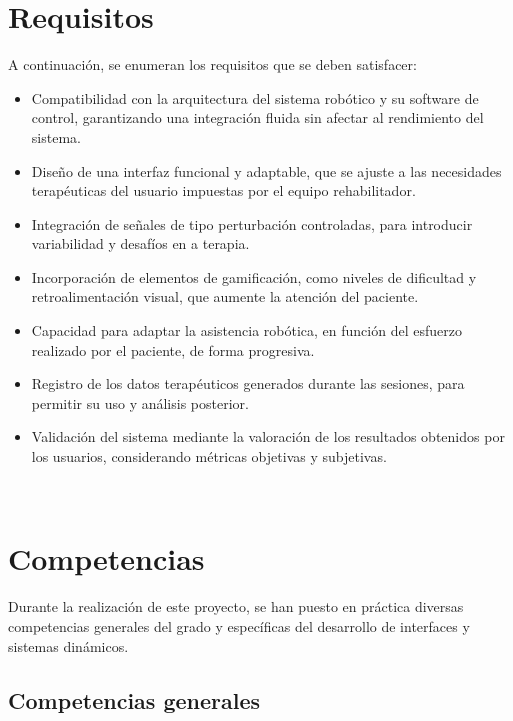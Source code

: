 \section{Requisitos}
\label{sec:requisitos}

A continuación, se enumeran los requisitos que se deben satisfacer:

\begin{itemize}
    \item Compatibilidad con la arquitectura del sistema robótico y su software de control, garantizando una integración fluida sin afectar al rendimiento del sistema.
    \item Diseño de una interfaz funcional y adaptable, que se ajuste a las necesidades terapéuticas del usuario impuestas por el equipo rehabilitador.
    \item Integración de señales de tipo perturbación controladas, para introducir variabilidad y desafíos en a terapia.
    \item Incorporación de elementos de gamificación, como niveles de dificultad y retroalimentación visual, que aumente la atención del paciente.
    \item Capacidad para adaptar la asistencia robótica, en función del esfuerzo realizado por el paciente, de forma progresiva.
    \item Registro de los datos terapéuticos generados durante las sesiones, para permitir su uso y análisis posterior.
    \item Validación del sistema mediante la valoración de los resultados obtenidos por los usuarios, considerando métricas objetivas y subjetivas.
\end{itemize}\

\section{Competencias}
\label{sec:competencias}

Durante la realización de este proyecto, se han puesto en práctica diversas competencias generales del grado y específicas del desarrollo de interfaces y sistemas dinámicos.

\subsection{Competencias generales}
\label{sec:competencias}

